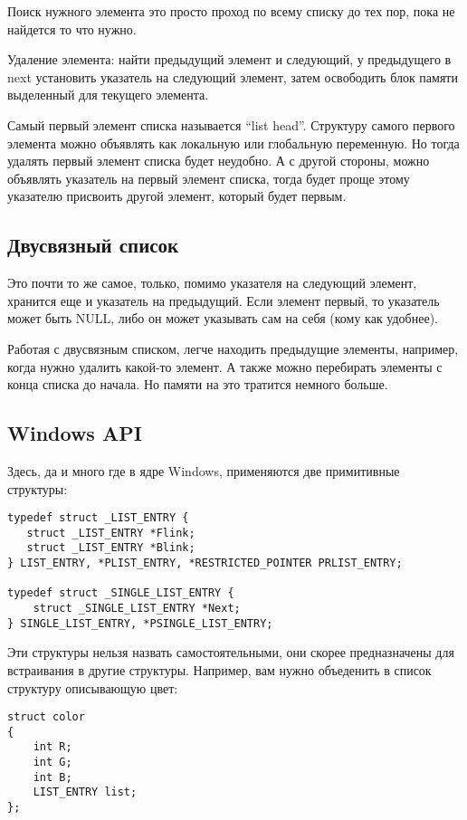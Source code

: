 Поиск нужного элемента это просто проход по всему списку до тех пор, пока не найдется то что нужно.

Удаление элемента: найти предыдущий элемент и следующий, 
у предыдущего в next установить указатель на следующий элемент, 
затем освободить блок памяти выделенный для текущего элемента.

Самый первый элемент списка называется ``list head''. Структуру самого первого элемента можно объявлять как локальную
или глобальную переменную. Но тогда удалять первый элемент списка будет неудобно. А с другой стороны,
можно объявлять указатель на первый элемент списка, тогда будет проще этому указателю присвоить другой элемент,
который будет первым.

\subsection{Двусвязный список}

Это почти то же самое, только, помимо указателя на следующий элемент, хранится еще и указатель на предыдущий.
Если элемент первый, то указатель может быть NULL, либо он может указывать сам на себя (кому как удобнее).

Работая с двусвязным списком, легче находить предыдущие элементы, например, когда нужно удалить какой-то элемент.
А также можно перебирать элементы с конца списка до начала.
Но памяти на это тратится немного больше.

\subsection{Windows API}

Здесь, да и много где в ядре Windows, применяются две примитивные структуры:

\begin{lstlisting}
typedef struct _LIST_ENTRY {
   struct _LIST_ENTRY *Flink;
   struct _LIST_ENTRY *Blink;
} LIST_ENTRY, *PLIST_ENTRY, *RESTRICTED_POINTER PRLIST_ENTRY;

typedef struct _SINGLE_LIST_ENTRY {
    struct _SINGLE_LIST_ENTRY *Next;
} SINGLE_LIST_ENTRY, *PSINGLE_LIST_ENTRY;
\end{lstlisting}

Эти структуры нельзя назвать самостоятельными, они скорее предназначены для встраивания в другие структуры.
Например, вам нужно объеденить в список структуру описывающую цвет:

\begin{lstlisting}
struct color
{
	int R;
	int G;
	int B;
	LIST_ENTRY list;
};
\end{lstlisting}

